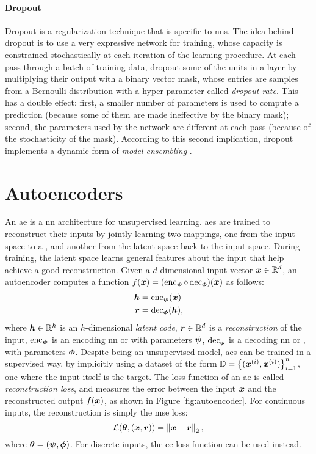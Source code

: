 \paragraph{Dropout}
Dropout \citep{srivastava2014dropout} is a regularization technique that is specific to \glspl{nn}. The idea behind dropout is to use a very expressive network for training, whose capacity is constrained stochastically at each iteration of the learning procedure. At each pass through a batch of training data, dropout  some of the units in a layer by multiplying their output with a binary vector mask, whose entries are samples from a Bernoulli distribution with a hyper-parameter called \emph{dropout rate}. This has a double effect: first, a smaller number of parameters is used to compute a prediction (because some of them are made ineffective by the binary mask); second, the parameters used by the network are different at each pass (because of the stochasticity of the mask). According to this second implication, dropout implements a dynamic form of \emph{model ensembling} \citep{ghahramani2016dropout}.

\section{Autoencoders}\label{sec:autoencoders}
An \gls{ae} \citep{baldi2012autoenc} is a \gls{nn} architecture for unsupervised learning. \glspl{ae} are trained to reconstruct their inputs by jointly learning two mappings, one from the input space to a , and another from the latent space back to the input space. During training, the latent space learns general features about the input that help achieve a good reconstruction. Given a $d$-dimensional input vector $\Vector{x} \in \Real^d$, an autoencoder computes a function $f(\Vector{x}) = (\EncoderNet \circ \DecoderNet)(\Vector{x})$ as follows:
\begin{align*}
    \Vector{h} &= \EncoderNet(\Vector{x})\\
    \Vector{r} &= \DecoderNet(\Vector{h}),
\end{align*}
where $\Vector{h} \in \Real^h$ is an $h$-dimensional \emph{latent code}, $\Vector{r} \in \Real^d$ is a \emph{reconstruction} of the input, $\operatorname{enc}_{\boldsymbol{\psi}}$ is an encoding \gls{nn} or  with parameters $\boldsymbol{\psi}$, $\operatorname{dec}_{\boldsymbol{\phi}}$ is a decoding \gls{nn} or , with parameters $\boldsymbol{\phi}$. Despite being an unsupervised model, \glspl{ae} can be trained in a supervised way, by implicitly using a dataset of the form $\Data = \Set{(\PatternVector{x}{i}, \PatternVector{x}{i})}_{i=1}^n$, \ie one where the input itself is the target. The loss function of an \gls{ae} is called \emph{reconstruction loss}, and measures the error between the input $\Vector{x}$ and the reconstructed output $f(\Vector{x})$, as shown in Figure \ref{fig:autoencoder}. For continuous inputs, the reconstruction is simply the \gls{mse} loss:
$$\Loss(\Param, (\Vector{x}, \Vector{r})) = \Norm{\Vector{x}-\Vector{r}}_2,$$
where $\boldsymbol{\theta} = (\boldsymbol{\psi}, \boldsymbol{\phi})$. For discrete inputs, the \gls{ce} loss function can be used instead.

